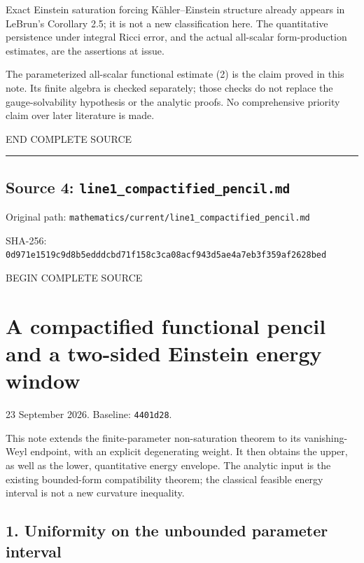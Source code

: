 \documentclass[
  10pt,
]{article}
\begin{document}
Exact Einstein saturation forcing Kähler--Einstein structure already
appears in LeBrun's Corollary 2.5; it is not a new classification here.
The quantitative persistence under integral Ricci error, and the actual
all-scalar form-production estimates, are the assertions at issue.

The parameterized all-scalar functional estimate (2) is the claim proved
in this note. Its finite algebra is checked separately; those checks do
not replace the gauge-solvability hypothesis or the analytic proofs. No
comprehensive priority claim over later literature is made.

END COMPLETE SOURCE

\begin{center}\rule{0.5\linewidth}{0.5pt}\end{center}

\hypertarget{source-4-line1_compactified_pencil.md}{%
\subsection{Source 4:
\nolinkurl{line1_compactified_pencil.md}}\label{source-4-line1_compactified_pencil.md}}

Original path:
\nolinkurl{mathematics/current/line1_compactified_pencil.md}

SHA-256:
\nolinkurl{0d971e1519c9d8b5edddcbd71f158c3ca08acf943d5ae4a7eb3f359af2628bed}

BEGIN COMPLETE SOURCE

\hypertarget{a-compactified-functional-pencil-and-a-two-sided-einstein-energy-window}{%
\section{A compactified functional pencil and a two-sided Einstein
energy
window}\label{a-compactified-functional-pencil-and-a-two-sided-einstein-energy-window}}

23 September 2026. Baseline: \texttt{4401d28}.

This note extends the finite-parameter non-saturation theorem to its
vanishing-Weyl endpoint, with an explicit degenerating weight. It then
obtains the upper, as well as the lower, quantitative energy envelope.
The analytic input is the existing bounded-form compatibility theorem;
the classical feasible energy interval is not a new curvature
inequality.

\hypertarget{uniformity-on-the-unbounded-parameter-interval}{%
\subsection{1. Uniformity on the unbounded parameter
interval}\label{uniformity-on-the-unbounded-parameter-interval}}
\end{document}
